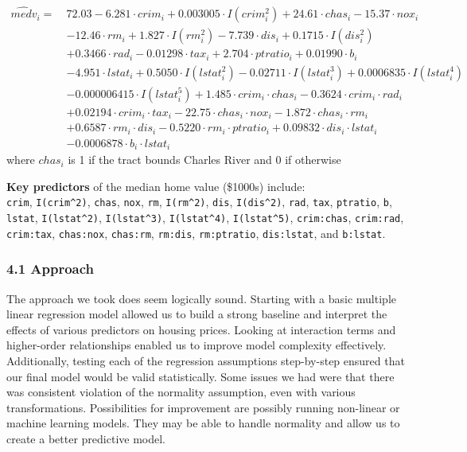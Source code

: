 \documentclass[
]{article}
\begin{document}
\[
\begin{aligned}
\hat{medv}_i =\ & 72.03 - 6.281 \cdot crim_i + 0.003005 \cdot I(crim_i^2) + 24.61 \cdot chas_i - 15.37 \cdot nox_i \\
& - 12.46 \cdot rm_i + 1.827 \cdot I(rm_i^2) - 7.739 \cdot dis_i + 0.1715 \cdot I(dis_i^2) \\
& + 0.3466 \cdot rad_i - 0.01298 \cdot tax_i + 2.704 \cdot ptratio_i + 0.01990 \cdot b_i \\
& - 4.951 \cdot lstat_i + 0.5050 \cdot I(lstat_i^2) - 0.02711 \cdot I(lstat_i^3) + 0.0006835 \cdot I(lstat_i^4) \\
& - 0.000006415 \cdot I(lstat_i^5) + 1.485 \cdot crim_i \cdot chas_i - 0.3624 \cdot crim_i \cdot rad_i \\
& + 0.02194 \cdot crim_i \cdot tax_i - 22.75 \cdot chas_i \cdot nox_i - 1.872 \cdot chas_i \cdot rm_i \\
& + 0.6587 \cdot rm_i \cdot dis_i - 0.5220 \cdot rm_i \cdot ptratio_i + 0.09832 \cdot dis_i \cdot lstat_i \\
& - 0.0006878 \cdot b_i \cdot lstat_i
\end{aligned}
\] where \(chas_{i}\) is 1 if the tract bounds Charles River and 0 if
otherwise

\textbf{Key predictors} of the median home value (\$1000s) include:\\
\texttt{crim}, \texttt{I(crim\^{}2)}, \texttt{chas}, \texttt{nox},
\texttt{rm}, \texttt{I(rm\^{}2)}, \texttt{dis}, \texttt{I(dis\^{}2)},
\texttt{rad}, \texttt{tax}, \texttt{ptratio}, \texttt{b},
\texttt{lstat}, \texttt{I(lstat\^{}2)}, \texttt{I(lstat\^{}3)},
\texttt{I(lstat\^{}4)}, \texttt{I(lstat\^{}5)}, \texttt{crim:chas},
\texttt{crim:rad}, \texttt{crim:tax}, \texttt{chas:nox},
\texttt{chas:rm}, \texttt{rm:dis}, \texttt{rm:ptratio},
\texttt{dis:lstat}, and \texttt{b:lstat}.

\subsubsection{4.1 Approach}\label{approach-1}

The approach we took does seem logically sound. Starting with a basic
multiple linear regression model allowed us to build a strong baseline
and interpret the effects of various predictors on housing prices.
Looking at interaction terms and higher-order relationships enabled us
to improve model complexity effectively. Additionally, testing each of
the regression assumptions step-by-step ensured that our final model
would be valid statistically. Some issues we had were that there was
consistent violation of the normality assumption, even with various
transformations. Possibilities for improvement are possibly running
non-linear or machine learning models. They may be able to handle
normality and allow us to create a better predictive model.
\end{document}

